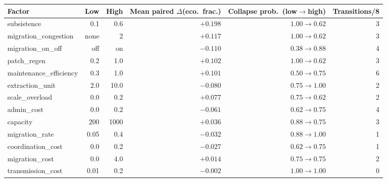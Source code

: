 \begin{tabular}{@{}lrrrrr@{}}
\toprule
\textbf{Factor} & \textbf{Low} & \textbf{High} & \textbf{Mean paired $\Delta$(eco.\ frac.)} & \textbf{Collapse prob.\ (low$\to$high)} & \textbf{Transitions/8} \\
\midrule
subsistence            & 0.1   & 0.6    & $+0.198$ & $1.00\to0.62$ & 3 \\
migration\_congestion  & none  & 2      & $+0.117$ & $1.00\to0.62$ & 3 \\
migration\_on\_off     & off   & on     & $-0.110$ & $0.38\to0.88$ & 4 \\
patch\_regen           & 0.2   & 1.0    & $+0.102$ & $1.00\to0.62$ & 3 \\
maintenance\_efficiency& 0.3   & 1.0    & $+0.101$ & $0.50\to0.75$ & 6 \\
extraction\_unit       & 2.0   & 10.0   & $-0.080$ & $0.75\to1.00$ & 2 \\
scale\_overload        & 0.0   & 0.2    & $+0.077$ & $0.75\to0.62$ & 2 \\
admin\_cost            & 0.0   & 0.2    & $-0.061$ & $0.62\to0.75$ & 4 \\
capacity               & 200   & 1000   & $+0.036$ & $0.88\to0.75$ & 3 \\
migration\_rate        & 0.05  & 0.4    & $-0.032$ & $0.88\to1.00$ & 1 \\
coordination\_cost     & 0.0   & 0.2    & $-0.027$ & $0.62\to0.75$ & 1 \\
migration\_cost        & 0.0   & 4.0    & $+0.014$ & $0.75\to0.75$ & 2 \\
transmission\_cost     & 0.01  & 0.2    & $-0.002$ & $1.00\to1.00$ & 0 \\
\bottomrule
\end{tabular}
